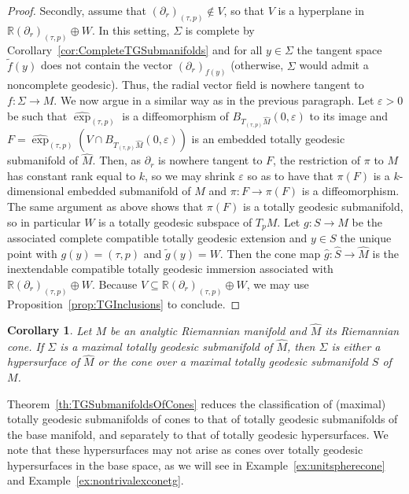\documentclass[11pt,a4paper,final]{amsart}
\newcommand{\R}{\mathbb{R}}
\renewcommand{\hat}{\widehat}
\renewcommand{\tilde}{\widetilde}
\newtheorem{corollary}[theorem]{Corollary}
\theoremstyle{definition}
\begin{document}
\begin{proof}
    Secondly, assume that $(\partial_{r})_{(\tau,p)}\notin V$, so that $V$ is a hyperplane in $\R (\partial_{r})_{(\tau,p)}\oplus W$.
	In this setting, $\Sigma$ is complete by Corollary~\ref{cor:CompleteTGSubmanifolds} and for all $y\in\Sigma$ the tangent space $\tilde{f}(y)$ does not contain the vector $(\partial_{r})_{f(y)}$ (otherwise, $\Sigma$ would admit a noncomplete geodesic).
	Thus, the radial vector field is nowhere tangent to $f\colon \Sigma \to M$.
	We now argue in a similar way as in the previous paragraph.
	Let $\varepsilon>0$ be such that $\hat{\exp}_{(\tau,p)}$ is a diffeomorphism of $B_{T_{(\tau,p)}\hat{M}}(0,\varepsilon)$ to its image and $F=\hat{\exp}_{(\tau,p)}(V\cap B_{T_{(\tau,p)}\hat{M}}(0,\varepsilon))$ is an embedded totally geodesic submanifold of $\hat{M}$.
	Then, as $\partial_{r}$ is nowhere tangent to $F$, the restriction of $\pi$ to $M$ has constant rank equal to $k$, so we may shrink $\varepsilon$ so as to have that $\pi(F)$ is a $k$-dimensional embedded submanifold of $M$ and $\pi\colon F\to \pi(F)$ is a diffeomorphism.
	The same argument as above shows that $\pi(F)$ is a totally geodesic submanifold, so in particular $W$ is a totally geodesic subspace of $T_{p}M$.
	Let $g\colon S\to M$ be the associated complete compatible totally geodesic extension and $y\in S$ the unique point with $g(y)=(\tau,p)$ and $\tilde{g}(y)=W$.
	Then the cone map $\hat{g}\colon\hat{S}\to\hat{M}$ is the inextendable compatible totally geodesic immersion associated with $\R(\partial_{r})_{(\tau,p)}\oplus W$.
	Because $V\subseteq \R(\partial_{r})_{(\tau,p)}\oplus W$, we may use Proposition~\ref{prop:TGInclusions} to conclude.
\end{proof}

\begin{corollary}\label{cor:MaximalTGSubmanifoldsOfCones} Let $M$ be an analytic Riemannian manifold and $\widehat{M}$ its Riemannian cone.
	If $\Sigma$ is a maximal totally geodesic submanifold of $\hat{M}$, then $\Sigma$ is either a hypersurface of $\hat{M}$ or the cone over a maximal totally geodesic submanifold $S$ of $M$.
\end{corollary}

Theorem~\ref{th:TGSubmanifoldsOfCones} reduces the classification of (maximal) totally geodesic submanifolds of cones to that of totally geodesic submanifolds of the base manifold, and separately to that of totally geodesic hypersurfaces.
We note that these hypersurfaces may not arise as cones over totally geodesic hypersurfaces in the base space, as we will see in Example~\ref{ex:unitspherecone} and Example~\ref{ex:nontrivalexconetg}.
\end{document}
